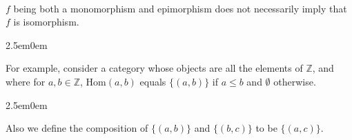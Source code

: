 \documentclass{book}
\newcommand{\exOne}{%
   \color{Purple}%
   \fontsize{14}{16}\selectfont%
}
\newcommand{\exTwo}{%
   \color{RedViolet}%
   \fontsize{13}{15}\selectfont%
}
\newcommand{\exP}{%
   \color{VioletRed}%
   \fontsize{12}{14}\selectfont%
}
\newenvironment{myIndent}{%
   \begin{adjustwidth}{2.5em}{0em}%
}{%
   \end{adjustwidth}%
}
\newcommand{\myHom}{\mathrm{Hom}}
\newcommand{\mySepTwo}[1][.]{%
   {\noindent\color{#1}{\rule{6.5in}{0.5mm}}}\\%
}
\begin{document}
\exOne\mySepTwo

$f$ being both a monomorphism and epimorphism does not necessarily imply that\\ $f$ is isomorphism.
\begin{myIndent} \exTwo
   For example, consider a category whose objects are all the elements of $\mathbb{Z}$, and\\ where for $a, b \in \mathbb{Z}$, $\myHom(a, b)$ equals $\{(a, b)\}$ if $a \leq b$ and $\emptyset$ otherwise.
   {\begin{myIndent}\exP
      Also we define the composition of $\{(a, b)\}$ and $\{(b, c)\}$ to be $\{(a, c)\}$.
   \end{myIndent}}

   \newpage

   
\end{myIndent}
\end{document}
